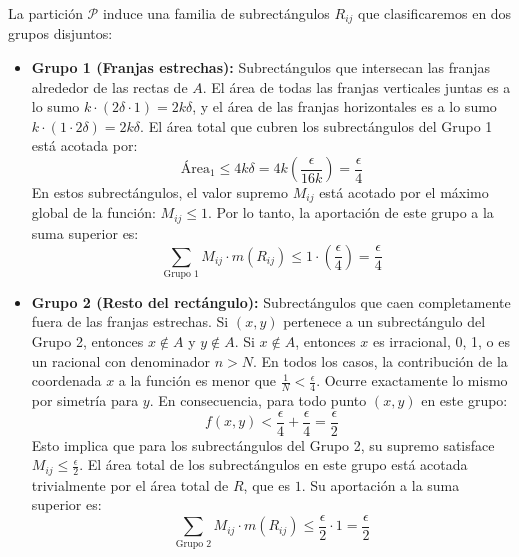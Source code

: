 \documentclass[11pt,letterpaper]{article}
\begin{document}
La partición $\mathcal{P}$ induce una familia de subrectángulos $R_{ij}$ que clasificaremos en dos grupos disjuntos:
\begin{itemize}
    \item \textbf{Grupo 1 (Franjas estrechas):} Subrectángulos que intersecan las franjas alrededor de las rectas de $A$. El área de todas las franjas verticales juntas es a lo sumo $k \cdot (2\delta \cdot 1) = 2k\delta$, y el área de las franjas horizontales es a lo sumo $k \cdot (1 \cdot 2\delta) = 2k\delta$. 
    El área total que cubren los subrectángulos del Grupo 1 está acotada por:
    \begin{equation*}
    \text{Área}_{1} \le 4k\delta = 4k \left(\frac{\epsilon}{16k}\right) = \frac{\epsilon}{4}
    \end{equation*}
    En estos subrectángulos, el valor supremo $M_{ij}$ está acotado por el máximo global de la función: $M_{ij} \le 1$.
    Por lo tanto, la aportación de este grupo a la suma superior es:
    \begin{equation*}
    \sum_{\text{Grupo 1}} M_{ij} \cdot m(R_{ij}) \le 1 \cdot \left(\frac{\epsilon}{4}\right) = \frac{\epsilon}{4}
    \end{equation*}

    \item \textbf{Grupo 2 (Resto del rectángulo):} Subrectángulos que caen completamente fuera de las franjas estrechas. Si $(x,y)$ pertenece a un subrectángulo del Grupo 2, entonces $x \notin A$ y $y \notin A$.
    Si $x \notin A$, entonces $x$ es irracional, 0, 1, o es un racional con denominador $n > N$. En todos los casos, la contribución de la coordenada $x$ a la función es menor que $\frac{1}{N} < \frac{\epsilon}{4}$. Ocurre exactamente lo mismo por simetría para $y$.
    En consecuencia, para todo punto $(x,y)$ en este grupo:
    \begin{equation*}
    f(x,y) < \frac{\epsilon}{4} + \frac{\epsilon}{4} = \frac{\epsilon}{2}
    \end{equation*}
    Esto implica que para los subrectángulos del Grupo 2, su supremo satisface $M_{ij} \le \frac{\epsilon}{2}$. El área total de los subrectángulos en este grupo está acotada trivialmente por el área total de $R$, que es $1$. 
    Su aportación a la suma superior es:
    \begin{equation*}
    \sum_{\text{Grupo 2}} M_{ij} \cdot m(R_{ij}) \le \frac{\epsilon}{2} \cdot 1 = \frac{\epsilon}{2}
    \end{equation*}
\end{itemize}
\end{document}
